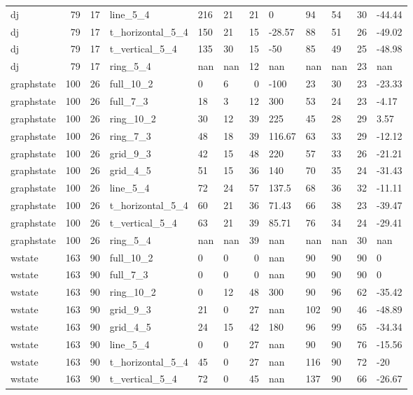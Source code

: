 \begin{longtable}{lrrlllrlllrl}
dj & 79 & 17 & line\_5\_4 & 216 & 21 & 21 & 0 & 94 & 54 & 30 & -44.44 \\
dj & 79 & 17 & t\_horizontal\_5\_4 & 150 & 21 & 15 & -28.57 & 88 & 51 & 26 & -49.02 \\
dj & 79 & 17 & t\_vertical\_5\_4 & 135 & 30 & 15 & -50 & 85 & 49 & 25 & -48.98 \\
dj & 79 & 17 & ring\_5\_4 & nan & nan & 12 & nan & nan & nan & 23 & nan \\
graphstate & 100 & 26 & full\_10\_2 & 0 & 6 & 0 & -100 & 23 & 30 & 23 & -23.33 \\
graphstate & 100 & 26 & full\_7\_3 & 18 & 3 & 12 & 300 & 53 & 24 & 23 & -4.17 \\
graphstate & 100 & 26 & ring\_10\_2 & 30 & 12 & 39 & 225 & 45 & 28 & 29 & 3.57 \\
graphstate & 100 & 26 & ring\_7\_3 & 48 & 18 & 39 & 116.67 & 63 & 33 & 29 & -12.12 \\
graphstate & 100 & 26 & grid\_9\_3 & 42 & 15 & 48 & 220 & 57 & 33 & 26 & -21.21 \\
graphstate & 100 & 26 & grid\_4\_5 & 51 & 15 & 36 & 140 & 70 & 35 & 24 & -31.43 \\
graphstate & 100 & 26 & line\_5\_4 & 72 & 24 & 57 & 137.5 & 68 & 36 & 32 & -11.11 \\
graphstate & 100 & 26 & t\_horizontal\_5\_4 & 60 & 21 & 36 & 71.43 & 66 & 38 & 23 & -39.47 \\
graphstate & 100 & 26 & t\_vertical\_5\_4 & 63 & 21 & 39 & 85.71 & 76 & 34 & 24 & -29.41 \\
graphstate & 100 & 26 & ring\_5\_4 & nan & nan & 39 & nan & nan & nan & 30 & nan \\
wstate & 163 & 90 & full\_10\_2 & 0 & 0 & 0 & nan & 90 & 90 & 90 & 0 \\
wstate & 163 & 90 & full\_7\_3 & 0 & 0 & 0 & nan & 90 & 90 & 90 & 0 \\
wstate & 163 & 90 & ring\_10\_2 & 0 & 12 & 48 & 300 & 90 & 96 & 62 & -35.42 \\
wstate & 163 & 90 & grid\_9\_3 & 21 & 0 & 27 & nan & 102 & 90 & 46 & -48.89 \\
wstate & 163 & 90 & grid\_4\_5 & 24 & 15 & 42 & 180 & 96 & 99 & 65 & -34.34 \\
wstate & 163 & 90 & line\_5\_4 & 0 & 0 & 27 & nan & 90 & 90 & 76 & -15.56 \\
wstate & 163 & 90 & t\_horizontal\_5\_4 & 45 & 0 & 27 & nan & 116 & 90 & 72 & -20 \\
wstate & 163 & 90 & t\_vertical\_5\_4 & 72 & 0 & 45 & nan & 137 & 90 & 66 & -26.67 \\

\end{longtable}
